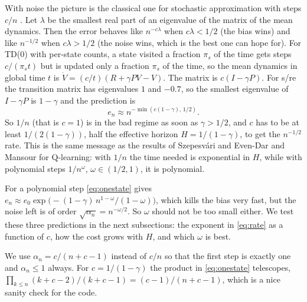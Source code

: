 With noise the picture is the classical one for stochastic approximation with steps $c/n$ \cite{kushner2003}. Let $\lambda$ be the smallest real part of an eigenvalue of the matrix of the mean dynamics. Then the error behaves like $n^{-c\lambda}$ when $c\lambda < 1/2$ (the bias wins) and like $n^{-1/2}$ when $c\lambda > 1/2$ (the noise wins, which is the best one can hope for). For TD(0) with per-state counts, a state visited a fraction $\pi_s$ of the time gets steps $c/(\pi_s t)$ but is updated only a fraction $\pi_s$ of the time, so the mean dynamics in global time $t$ is $\dot V = (c/t)(R + \gamma P V - V)$. The matrix is $c(I - \gamma P)$. For s/re the transition matrix has eigenvalues $1$ and $-0.7$, so the smallest eigenvalue of $I - \gamma P$ is $1 - \gamma$ and the prediction is
\begin{equation}
e_n \approx n^{-\min(c(1-\gamma),\, 1/2)} .
\label{eq:rate}
\end{equation}
So $1/n$ (that is $c = 1$) is in the bad regime as soon as $\gamma > 1/2$, and $c$ has to be at least $1/(2(1-\gamma))$, half the effective horizon $H = 1/(1-\gamma)$, to get the $n^{-1/2}$ rate. This is the same message as the results of Szepesv\'ari \cite{szepesvari1997} and Even-Dar and Mansour \cite{evendar2003} for Q-learning: with $1/n$ the time needed is exponential in $H$, while with polynomial steps $1/n^\omega$, $\omega \in (1/2, 1)$, it is polynomial.

For a polynomial step \eqref{eq:onestate} gives $e_n \approx e_0 \exp\!\big(-(1-\gamma)\, n^{1-\omega}/(1-\omega)\big)$, which kills the bias very fast, but the noise left is of order $\sqrt{\alpha_n} = n^{-\omega/2}$. So $\omega$ should not be too small either. We test these three predictions in the next subsections: the exponent in \eqref{eq:rate} as a function of $c$, how the cost grows with $H$, and which $\omega$ is best.

We use $\alpha_n = c/(n + c - 1)$ instead of $c/n$ so that the first step is exactly one and $\alpha_n \le 1$ always. For $c = 1/(1-\gamma)$ the product in \eqref{eq:onestate} telescopes, $\prod_{k \le n} (k + c - 2)/(k + c - 1) = (c-1)/(n + c - 1)$, which is a nice sanity check for the code.
